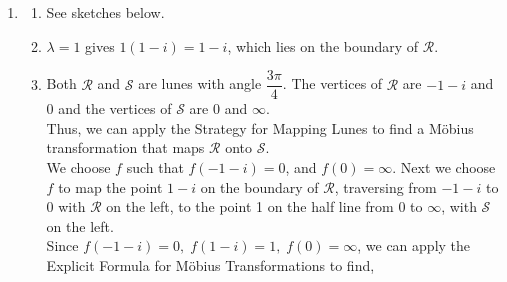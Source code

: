 \begin{enumerate}[label=(\alph*)]
\begin{enumerate}[label=(\roman*)]
    \item 
    The point $z = 99$ is outside the disc $ \{z: |z+i| < 2 \} $ and 
    \begin{align*}
        \left| \frac{ (99+i)^3 }{e^{99}} \right| &\leq \left| \frac{100^3}{e^{99}} \right| = \left| \frac{10^6}{e^{99}} \right| \\ 
        \intertext{by the Triangle Inequality,}
        &<  \left| \frac{(2^{10})^2}{ e^{99} } \right|
        \intertext{as $2^{10} > 10^3$,}
        &< \left| \frac{(2^{10})^2}{ e^{90} } \right| \\
        &< \left| \frac{2^{20}}{ 2^{90} } \right| = 2^{-70} < 1.
    \end{align*}
    So $ \alpha = \dfrac{ (99+i)^3 }{e^{99}} $ has a modulus less than 1, and has a solution, $z=99$, of equation $ (*) $.
    \end{enumerate}
    \leavevmode \vvs\\
    \item
    \begin{enumerate}[label=(\roman*)]
        \item 
        See sketches below.
        \vvs \\
        \begin{figure}
            \centering
            
        \end{figure}
        \item 
        $ \lambda = 1 $ gives $ 1(1-i) = 1-i $, which lies on the boundary of $ \mathcal{R} $.
        \vvs \\
        \item 
        Both $ \mathcal{R} $ and $ \mathcal{S} $ are lunes with angle $ \dfrac{3\pi}{4} $. The vertices of $ \mathcal{R} $ are $ -1-i $ and $0$ and the vertices of $ \mathcal{S} $ are 0 and $\infty$.
        \vs \\
        Thus, we can apply the Strategy for Mapping Lunes to find a Möbius transformation that maps $ \mathcal{R} $ onto $ \mathcal{S} $. 
        \vs \\
        We choose $f$ such that $ f(-1-i) = 0 $, and $ f(0) = \infty $. Next we choose $f$ to map the point $1-i$ on the boundary of $ \mathcal{R} $, traversing from $-1-i$ to 0 with $ \mathcal{R} $ on the left, to the point 1 on the half line from 0 to $\infty$, with $ \mathcal{S} $ on the left.
        \vs \\
        Since $ f(-1-i) = 0, \; f(1-i) = 1, \; f(0) = \infty $, we can apply the Explicit Formula for Möbius Transformations to find,

\end{enumerate}
\end{enumerate}
